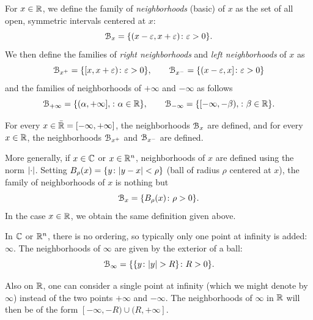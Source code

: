 \begin{definition}[neighborhood]
For $x\in {\mathbb R}$, we define the family of \emph{neighborhoods}%
%
 (basic) of $x$
as the set of all open, symmetric intervals centered at $x$:
\[
  \mathcal B_x = {\left\{  (x-\varepsilon, x+\varepsilon) \colon \varepsilon>0 \right\}}.
\]
We then define the families 
of \emph{right neighborhoods} and \emph{left neighborhoods}
%
of $x$ as
\[
  \mathcal B_{x^+} = {\left\{  [x, x+\varepsilon) \colon \varepsilon>0 \right\}},
  \qquad
  \mathcal B_{x^-} = {\left\{  (x-\varepsilon , x] \colon \varepsilon>0 \right\}}
\]
and the families of neighborhoods of $+\infty$ and $-\infty$ as follows
\[
  \mathcal B_{+\infty} = {\left\{  (\alpha,+\infty], \colon \alpha \in {\mathbb R}  \right\}},\qquad
  \mathcal B_{-\infty} = {\left\{  [-\infty, -\beta), \colon \beta\in {\mathbb R} \right\}}.
\]

For every $x\in \bar {{\mathbb R}} = [-\infty, +\infty]$,
the neighborhoods $\mathcal B_x$ are defined, and for
every $x\in {\mathbb R}$, the neighborhoods $\mathcal B_{x^+}$ and $\mathcal B_{x^-}$ are defined.

More generally, if $x\in {\mathbb C}$ or $x\in {\mathbb R}^n$,
neighborhoods of $x$ are defined 
using the norm ${\left|\cdot\right|}$.
Setting $B_\rho(x) = {\left\{ y\colon {\left|y-x\right|}<\rho \right\}}$
(ball of radius $\rho$ centered at $x$),
the family of neighborhoods of $x$ is nothing but
\[
  \mathcal B_x = {\left\{ B_\rho(x)\colon \rho>0 \right\}}.
\]
In the case $x\in {\mathbb R}$, we obtain the same definition given above.

In ${\mathbb C}$ or ${\mathbb R}^n$, there is no ordering, so 
typically only one point at infinity is added: $\infty$.
The neighborhoods of $\infty$
are given by the exterior of a ball:
\[
  \mathcal B_\infty = {\left\{ {\left\{ y\colon {\left|y\right|}> R \right\}}\colon R>0 \right\}}.
\]

Also on ${\mathbb R}$, one can consider a single point 
at infinity (which we might denote by $\infty$)
instead of the two points $+\infty$ and $-\infty$. 
The neighborhoods of $\infty$ in ${\mathbb R}$ will then be of the form $[-\infty,-R)
\cup (R,+\infty]$.
\end{definition}


